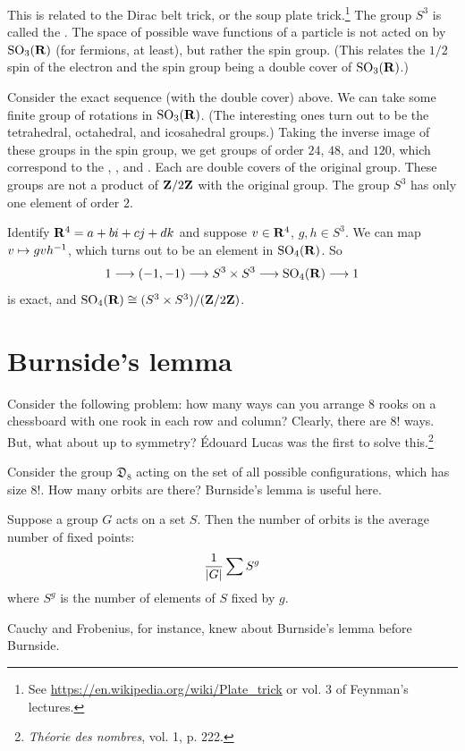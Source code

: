 \documentclass[11pt, twoside]{amsart}
\begin{document}
This is related to the Dirac belt trick, or the soup plate trick.\footnote{See \url{https://en.wikipedia.org/wiki/Plate_trick} or vol. $3$ of Feynman's lectures.} %
The group $S^3$ is called the . The space of possible wave functions of a particle is not acted on by $\operatorname{SO}_3(\mathbf R)$ (for fermions, at least), but rather the spin group. (This relates the $1/2$ spin of the electron and the spin group being a double cover of $\operatorname{SO}_3(\mathbf R)$.) 

Consider the exact sequence (with the double cover) above. We can take some finite group of rotations in $\operatorname{SO}_3(\mathbf R)$. (The interesting ones turn out to be the tetrahedral, octahedral, and icosahedral groups.) Taking the inverse image of these groups in the spin group, we get groups of order $24$, $48$, and $120$, which correspond to the , , and . Each are double covers of the original group. These groups are not a product of $\mathbf{Z}/2\mathbf{Z}$ with the original group. The group $S^3$ has only one element of order $2$.

Identify $\mathbf R^4 = a + bi + cj + dk$ and suppose $v\in \mathbf R^4$, $g,h\in S^3$. We can map $v\mapsto gvh^{-1}$, which turns out to be an element in $\operatorname{SO}_4(\mathbf R)$. So  
$$
1\longrightarrow (-1,-1)\longrightarrow S^3 \times S^3 \longrightarrow \operatorname{SO}_4(\mathbf R) \longrightarrow 1
$$
is exact, and $\operatorname{SO}_4(\mathbf R) \cong (S^3 \times S^3)/(\mathbf{Z}/2\mathbf{Z})$.

\section{Burnside's lemma}
Consider the following problem: how many ways can you arrange $8$ rooks on a chessboard with one rook in each row and column? Clearly, there are $8!$ ways. But, what about up to symmetry? \'Edouard Lucas was the first to solve this.\footnote{\textit{Théorie des nombres}, vol. 1, p. 222.}

Consider the group $\mathfrak{D}_8$ acting on the set of all possible configurations, which has size $8!$. How many orbits are there? Burnside's lemma is useful here.
\begin{lemma}[Burnside]
Suppose a group $G$ acts on a set $S$. Then the number of orbits is the average number of fixed points: 
$$
\frac{1}{\left \lvert G \right \rvert} \sum S^g
$$
where $S^g$ is the number of elements of $S$ fixed by $g$.
\end{lemma}

Cauchy and Frobenius, for instance, knew about Burnside's lemma before Burnside.
\end{document}
